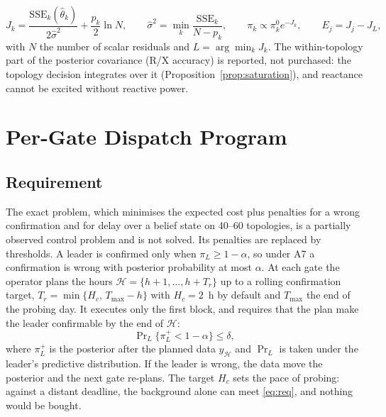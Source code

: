 \documentclass[journal,onecolumn,11pt]{IEEEtran}
\begin{document}
\begin{equation}\label{eq:bic}
J_k=\frac{\mathrm{SSE}_k(\hat\theta_k)}{2\hat\sigma^2}+\frac{p_k}{2}\ln N,\qquad
\hat\sigma^2=\min_k\frac{\mathrm{SSE}_k}{N-p_k},\qquad
\pi_k\propto\pi_k^0e^{-J_k},\qquad E_j=J_j-J_L,
\end{equation}
with $N$ the number of scalar residuals and $L=\arg\min_kJ_k$. The within-topology part of the posterior covariance (R/X accuracy) is reported, not purchased: the topology decision integrates over it (Proposition~\ref{prop:saturation}), and reactance cannot be excited without reactive power.

\section{Per-Gate Dispatch Program}\label{sec:program}

\subsection{Requirement}
The exact problem, which minimises the expected cost plus penalties for a wrong confirmation and for delay over a belief state on 40--60 topologies, is a partially observed control problem and is not solved. Its penalties are replaced by thresholds. A leader is confirmed only when $\pi_L\ge1-\alpha$, so under A7 a confirmation is wrong with posterior probability at most $\alpha$. At each gate the operator plans the hours $\mathcal H=\{h+1,\dots,h+T_r\}$ up to a rolling confirmation target, $T_r=\min\{H_c,\,T_{\max}-h\}$ with $H_c=2$~h by default and $T_{\max}$ the end of the probing day. It executes only the first block, and requires that the plan make the leader confirmable by the end of $\mathcal H$:
\begin{equation}\label{eq:req}
\Pr\nolimits_L\big\{\pi_L^+<1-\alpha\big\}\le\delta ,
\end{equation}
where $\pi_L^+$ is the posterior after the planned data $y_{\mathcal H}$ and $\Pr_L$ is taken under the leader's predictive distribution. If the leader is wrong, the data move the posterior and the next gate re-plans. The target $H_c$ sets the pace of probing: against a distant deadline, the background alone can meet \eqref{eq:req}, and nothing would be bought.
\end{document}
